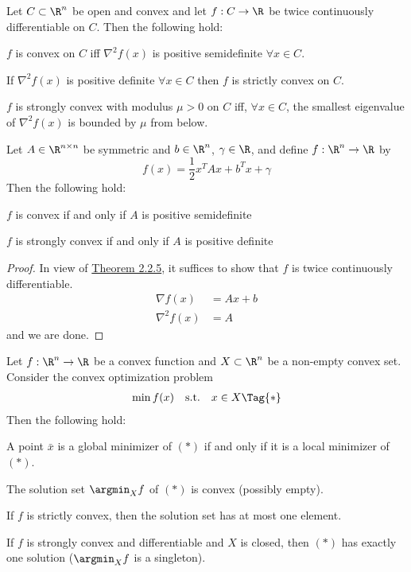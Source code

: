 Let $C\subset\R^n$ be open and convex and let $f:C\to\R$ be twice
continuously differentiable on $C$. Then the following hold:
\begin{enumerata}
	\def\allx{\forall x\in C}
	\def\hessian{\nabla^2f(x)}
	\item $f$ is convex on $C$ iff $\hessian$ is positive
	semidefinite $\allx$.
	\item If $\hessian$ is positive definite $\allx$ then $f$ is
	strictly convex on $C$.
	\item $f$ is strongly convex with modulus $\mu>0$ on $C$ iff,
	$\allx$, the smallest eigenvalue of $\hessian$ is bounded by $\mu$
	from below.
\end{enumerata}

\label{de25005}

Let $A\in\R^{n\times n}$ be symmetric and $b\in\R^n$, $\gamma\in\R$,
and define $f:\R^n\to\R$ by
$$
	f(x)=\frac12x^TAx+b^Tx+\gamma
$$
Then the following hold:
\begin{enumerata}
	\item $f$ is convex if and only if $A$ is positive semidefinite
	\item $f$ is strongly convex if and only if $A$ is positive definite
\end{enumerata}

\begin{proof}

	In view of \href{eeb9c30}{Theorem 2.2.5}, it suffices to show that $f$ is
	twice continuously differentiable.
	\begin{align*}
		\nabla f(x)  & = Ax + b \\
		\nabla^2f(x) & = A
	\end{align*}
	and we are done.
\end{proof}

\label{f546fc9}

Let $f:\R^n\to\R$ be a convex function and $X\subset\R^n$ be a
non-empty convex set. Consider the convex optimization problem
\begin{equation*}
	\begin{array}{l l l}
		\min f(x) & \text{s.t.} & x\in X\Tag{*}
	\end{array}
\end{equation*}
Then the following hold:
\begin{enumerata}
	\item A point $\bar x$ is a global minimizer of $(*)$ if and only if
	it is a local minimizer of $(*)$.
	\item The solution set $\argmin_Xf$ of $(*)$ is convex (possibly
	empty).
	\item If $f$ is strictly convex, then the solution set has at most
	one element.
	\item If $f$ is strongly convex and differentiable and $X$ is closed, then $(*)$ has exactly
	one solution ($\argmin_Xf$ is a singleton).
\end{enumerata}

